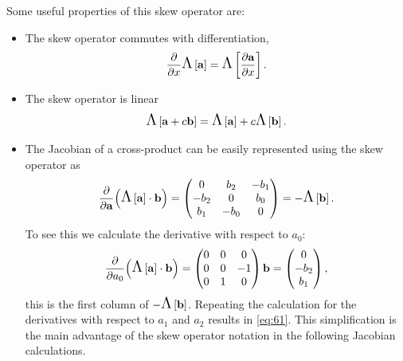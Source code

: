 Some useful properties of this skew operator are:
\begin{itemize}
\item The skew operator commutes with differentiation, \ie
  \begin{equation}
    \frac{\partial }{\partial x} \text{\Large{$\Lambda$}}\left[ {\boldsymbol{\mathrm{a}}} \right] = \text{\Large{$\Lambda$}}\left[  \frac{\partial {\boldsymbol{\mathrm{a}}}}{\partial x}  \right].
  \end{equation}

\item The skew operator is linear
  \begin{equation}
    \text{\Large{$\Lambda$}}\left[ {\boldsymbol{\mathrm{a}}} + c {\boldsymbol{\mathrm{b}}} \right] = \text{\Large{$\Lambda$}}\left[ {\boldsymbol{\mathrm{a}}} \right] + c \text{\Large{$\Lambda$}}\left[ {\boldsymbol{\mathrm{b}}} \right].
  \end{equation}

\item The Jacobian of a cross-product can be easily represented using the skew operator as
  \begin{equation}
    \pd{}{\av} \bigb{ \skewm{\av} \cdot \bv } = \begin{pmatrix}
      0 & b_2 & -b_1 \\
      -b_2 & 0 & b_0 \\
      b_1 & -b_0 & 0
    \end{pmatrix} = -\skewm{\bv}.
    \label{eq:61}
  \end{equation}
  To see this we calculate the derivative with respect to $a_0$:
  \begin{equation}
    \frac{\partial }{\partial a_0} {\left(  \text{\Large{$\Lambda$}}\left[ {\boldsymbol{\mathrm{a}}} \right] \cdot {\boldsymbol{\mathrm{b}}}  \right)} = \begin{pmatrix}
      0 & 0 & 0 \\
      0 & 0 & -1 \\
      0 & 1 & 0
    \end{pmatrix}{\boldsymbol{\mathrm{b}}} = \begin{pmatrix} 0 \\ -b_2 \\ b_1 \end{pmatrix},
  \end{equation}
  this is the first column of $-\text{\Large{$\Lambda$}}\left[ {\boldsymbol{\mathrm{b}}} \right]$.
  Repeating the calculation for the derivatives with respect to $a_1$ and $a_2$ results in \cref{eq:61}.
  This simplification is the main advantage of the skew operator notation in the following Jacobian calculations.
\end{itemize}

